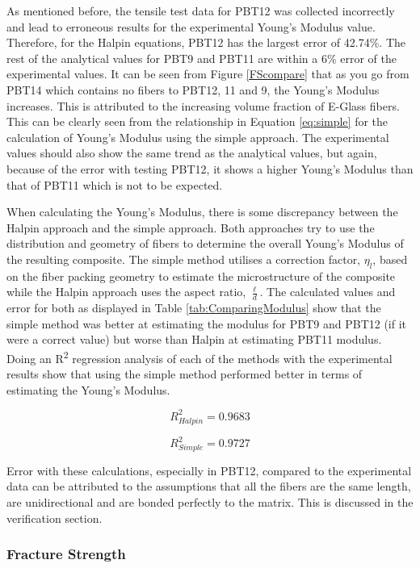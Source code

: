 \documentclass[11pt]{article}
\begin{document}
As mentioned before, the tensile test data for PBT12 was collected incorrectly and lead to erroneous results for the experimental Young's Modulus value. Therefore, for the Halpin equations, PBT12 has the largest error of 42.74\%. The rest of the analytical values for PBT9 and PBT11 are within a 6\% error of the experimental values. It can be seen from Figure \ref{FScompare} that as you go from PBT14 which contains no fibers to PBT12, 11 and  9, the Young's Modulus increases. This is attributed to the increasing volume fraction of E-Glass fibers. This can be clearly seen from the relationship in Equation \ref{eq:simple} for the calculation of Young's Modulus using the simple approach. The experimental values should also show the same trend as the analytical values, but again, because of the error with testing PBT12, it shows a higher Young's Modulus than that of PBT11 which is not to be expected. 

When calculating the Young's Modulus, there is some discrepancy between the Halpin approach and the simple approach. Both approaches try to use the distribution and geometry of fibers to determine the overall Young's Modulus of the resulting composite. The simple method utilises a correction factor, \(\eta_l\), based on the fiber packing geometry to estimate the microstructure of the composite while the Halpin approach uses the aspect ratio, \(\frac{\ell}{d}\). The calculated values and error for both as displayed in Table \ref{tab:ComparingModulus} show that the simple method was better at estimating the modulus for PBT9 and PBT12 (if it were a correct value) but worse than Halpin at estimating PBT11 modulus. Doing an R\textsuperscript{2} regression analysis of each of the methods with the experimental results show that using the simple method performed better in terms of estimating the Young's Modulus.

\begin{equation}
R^2_{Halpin} = 0.9683
\end{equation}

\begin{equation}
R^2_{Simple} = 0.9727
\end{equation}

Error with these calculations, especially in PBT12, compared to the experimental data can be attributed to the assumptions that all the fibers are the same length, are unidirectional and are bonded perfectly to the matrix. This is discussed in the verification section.
\newpage
\subsubsection{Fracture Strength}
\end{document}
